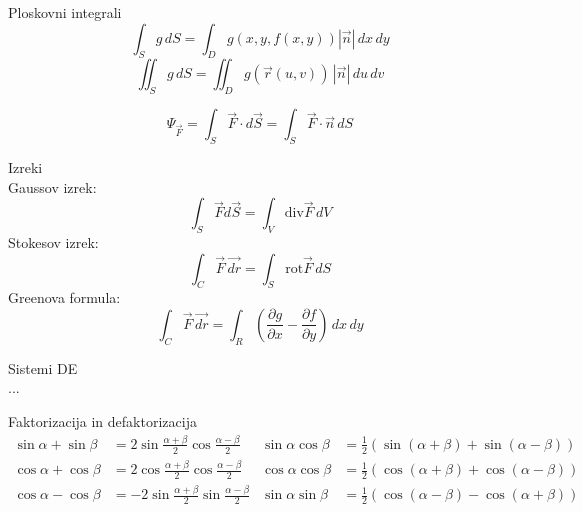 \documentclass[a4paper,10pt]{article}
\begin{document}
\begin{multicols}{2}
\begin{formulaBox}{Ploskovni integrali}
\[
\int_S g\,dS=\int_D g(x,y,f(x,y))|\vec{n}|\,dx\,dy
\]
\[
\iint_S g\,dS=\iint_D g(\vec r(u,v))\,|\vec{n}|\,du\,dv
\]

\[
\Psi_{\vec{F}}=\int_S \vec{F}\cdot d\vec{S} = \int_S \vec{F}\cdot \vec{n}\,dS
\]
\end{formulaBox}

\begin{formulaBox}{Izreki}
	\\
Gaussov izrek:
\[
\int_{S}\vec{F} d\vec{S}=\int_V \text{div}\vec{F}\,dV
\]
Stokesov izrek:
\[
\int_C \vec{F}\,\vec{dr} = \int_{S} \text{rot}\vec{F}\,dS
\]
Greenova formula:
\[
\int_C \vec{F}\,\vec{dr} = \int_R\left(\frac{\partial g}{\partial x}-\frac{\partial f}{\partial y}\right)\,dx\,dy
\]
\end{formulaBox}

\begin{formulaBox}{Sistemi DE}
	\\
	...
\end{formulaBox}





\end{multicols}
\begin{formulaBox}{Faktorizacija in defaktorizacija}
\begin{align*}
\sin \alpha + \sin \beta &= 2 \sin \frac{\alpha + \beta}{2} \cos \frac{\alpha - \beta}{2} & \sin \alpha \cos \beta &= \frac{1}{2}(\sin(\alpha + \beta) + \sin(\alpha - \beta)) \\
\cos \alpha + \cos \beta &= 2 \cos \frac{\alpha + \beta}{2} \cos \frac{\alpha - \beta}{2} & \cos \alpha \cos \beta &= \frac{1}{2}(\cos(\alpha + \beta) + \cos(\alpha - \beta)) \\
\cos \alpha - \cos \beta &= -2 \sin \frac{\alpha + \beta}{2} \sin \frac{\alpha - \beta}{2} & \sin \alpha \sin \beta &= \frac{1}{2}(\cos(\alpha - \beta) - \cos(\alpha + \beta))
\end{align*}
\end{formulaBox}
\end{document}
